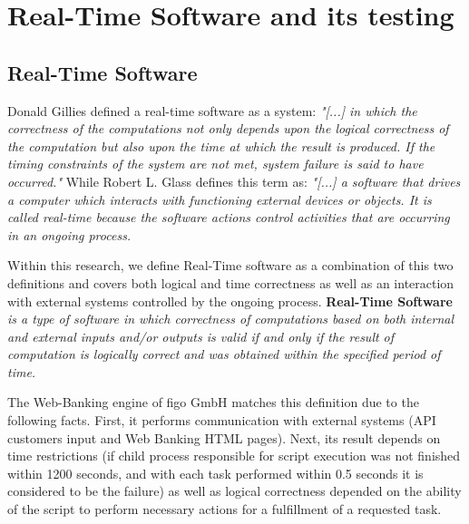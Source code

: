 \chapter{Real-Time Software and its testing}
\label{chap:rt}
\section{Real-Time Software}
Donald Gillies \cite{rtG} defined a real-time software as a system: \textit{"[...] in which the correctness of the computations not only depends upon the logical correctness of the computation but also upon the time at which the result is produced. If the timing constraints of the system are not met, system failure is said to have occurred."} While Robert L. Glass \cite{RealTimeTesting} defines this term as: \textit{"[...] a software that drives a computer which interacts with functioning external devices or objects. It is called real-time because the software actions control activities that are occurring in an ongoing process.} 

Within this research, we define  Real-Time software as a combination of this two definitions and covers both logical and time correctness as well as an interaction with external systems controlled by the ongoing process. \textbf{Real-Time Software} \textit{is a type of software in which correctness of computations based on both internal and external inputs and/or outputs is valid if and only if the result of computation is logically correct and was obtained within the specified period of time.}

The Web-Banking engine of figo GmbH matches this definition due to the following facts. First, it performs communication with external systems (API customers input and Web Banking HTML pages). Next, its result depends on time restrictions (if child process responsible for script execution was not finished within 1200 seconds, and with each task performed within 0.5 seconds it is considered to be the failure) as well as logical correctness depended on the ability of the script to perform necessary actions for a fulfillment of a requested task.



